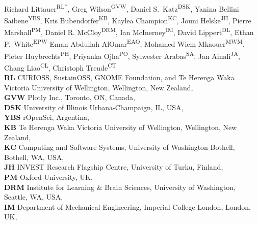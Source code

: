 \documentclass[10pt,letterpaper]{article}
\begin{document}
\vspace*{0.2in}

\begin{flushleft}
{\Large
\textbf{}
}
\newline
\\
Richard Littauer\textsuperscript{RL*},
Greg Wilson\textsuperscript{GVW},
Daniel S.\ Katz\textsuperscript{DSK},
Yanina Bellini Saibene\textsuperscript{YBS},
Kris Bubendorfer\textsuperscript{KB},
Kaylea Champion\textsuperscript{KC},
Jouni Helske\textsuperscript{JH},
Pierre Marshall\textsuperscript{PM},
Daniel R. McCloy\textsuperscript{DRM},
Ian McInerney\textsuperscript{IM},
David Lippert\textsuperscript{DL},
Ethan P.\ White\textsuperscript{EPW}
Eman Abdullah AlOmar\textsuperscript{EAO},
Mohamed Wiem Mkaouer\textsuperscript{MWM},
Pieter Huybrechts\textsuperscript{PH},
Priyanka Ojha\textsuperscript{PO},
Sylwester Arabas\textsuperscript{SA},
Jan Ainali\textsuperscript{JA},
Chang Liao\textsuperscript{CL},
Christoph Treude\textsuperscript{CT}
\\
\bigskip
\textbf{RL} CURIOSS, SustainOSS, GNOME Foundation, and Te Herenga Waka Victoria University of Wellington, Wellington, New Zealand, \\
\textbf{GVW} Plotly Inc., Toronto, ON, Canada, \\
\textbf{DSK} University of Illinois Urbana-Champaign, IL, USA, \\
\textbf{YBS} rOpenSci, Argentina, \\
\textbf{KB} Te Herenga Waka Victoria University of Wellington, Wellington, New Zealand, \\
\textbf{KC} Computing and Software Systems, University of Washington Bothell, Bothell, WA, USA, \\
\textbf{JH} INVEST Research Flagship Centre, University of Turku, Finland, \\
\textbf{PM} Oxford University, UK, \\
\textbf{DRM} Institute for Learning \& Brain Sciences, University of Washington, Seattle, WA, USA, \\
\textbf{IM} Department of Mechanical Engineering, Imperial College London, London, UK, \\

\end{flushleft}
\end{document}
